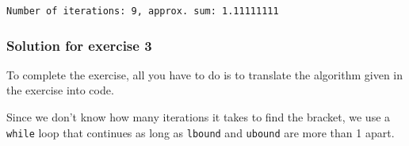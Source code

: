 \documentclass[10pt]{scrartcl}
\begin{document}
    \begin{Verbatim}[commandchars=\\\{\}]
Number of iterations: 9, approx. sum: 1.11111111
    \end{Verbatim}

    \hypertarget{solution-for-exercise-3}{%
\subsubsection{Solution for exercise 3}\label{solution-for-exercise-3}}

To complete the exercise, all you have to do is to translate the
algorithm given in the exercise into code.

Since we don't know how many iterations it takes to find the bracket, we
use a \texttt{while} loop that continues as long as \texttt{lbound} and
\texttt{ubound} are more than 1 apart.
\end{document}
